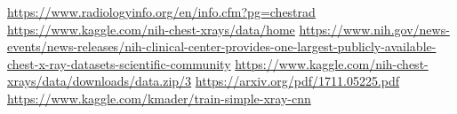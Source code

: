 \documentclass{article}
\begin{document}
    \begin{thebibliography}{999}

         \url{https://www.radiologyinfo.org/en/info.cfm?pg=chestrad}
         \url{https://www.kaggle.com/nih-chest-xrays/data/home} 
         \url{https://www.nih.gov/news-events/news-releases/nih-clinical-center-provides-one-largest-publicly-available-chest-x-ray-datasets-scientific-community}
         \url{https://www.kaggle.com/nih-chest-xrays/data/downloads/data.zip/3}
         \url{https://arxiv.org/pdf/1711.05225.pdf}
         \url{https://www.kaggle.com/kmader/train-simple-xray-cnn}

    \end{thebibliography}
\end{document}
